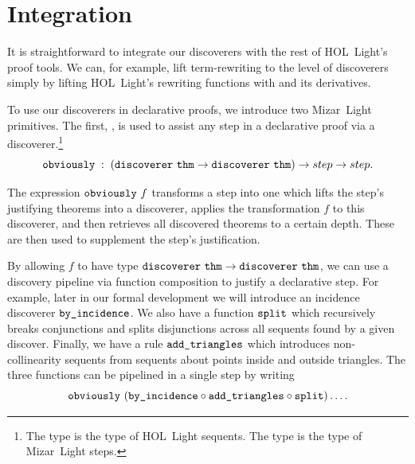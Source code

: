 

\section{Integration}
It is straightforward to integrate our discoverers with the rest of HOL~Light's proof tools. We can, for example, lift term-rewriting to the level of discoverers simply by lifting HOL~Light's rewriting functions with  and its derivatives. 

To use our discoverers in declarative proofs, we introduce two Mizar~Light primitives. The first, , is used to assist any step in a declarative proof via a discoverer.\footnote{The type  is the type of HOL~Light sequents. The type  is the type of Mizar~Light steps.}
\begin{displaymath}
  \code{obviously}\;:\;(\code{discoverer}\ \code{thm}\rightarrow\code{discoverer}\ \code{thm}) \rightarrow step \rightarrow step.
\end{displaymath}

The expression $\texttt{obviously}\  f$ transforms a step into one which lifts the step's justifying theorems into a discoverer, applies the transformation $f$ to this discoverer, and then retrieves all discovered theorems to a certain depth. These are then used to supplement the step's justification.

By allowing $f$ to have type $\code{discoverer}\ \code{thm}\rightarrow\code{discoverer}\ \code{thm}$, we can use a discovery pipeline via function composition to justify a declarative step. For example, later in our formal development we will introduce an incidence discoverer $\texttt{by\_incidence}$. We also have a function $\texttt{split}$  which recursively breaks conjunctions and splits disjunctions across all sequents found by a given discover. Finally, we have a rule $\texttt{add\_triangles}$ which introduces non-collinearity sequents from sequents about points inside and outside triangles. The three functions can be pipelined in a single step by writing
\begin{displaymath}
\code{obviously}\ (\code{by\_incidence}\circ \code{add\_triangles}\circ \code{split}) \ldots.
\end{displaymath}

